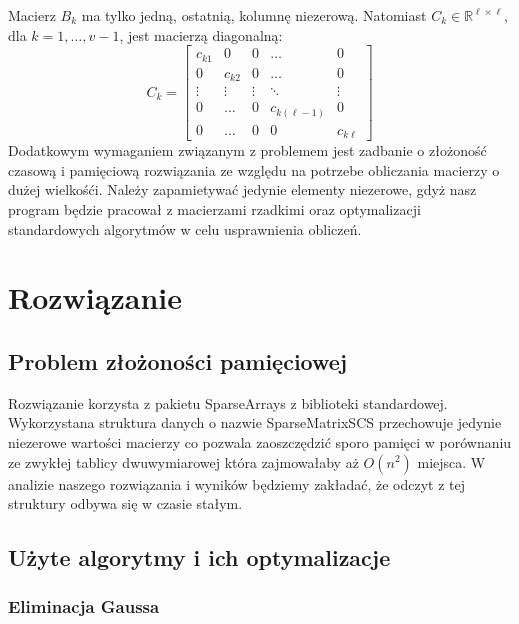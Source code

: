 \documentclass{article}
\begin{document}
	Macierz $B_k$ ma tylko jedną, ostatnią, kolumnę niezerową. Natomiast $C_k \in \mathbb{R}^{\ell \times \ell}$, dla $k = 1, \ldots, v - 1$, jest macierzą diagonalną:\\
	\[
	C_k = \begin{bmatrix}
	    c_{k1} & 0 & 0 & \dots & 0 \\
	    0 & c_{k2} & 0 & \dots & 0 \\
	    \vdots & \vdots & \vdots & \ddots & \vdots \\
	    0 & \dots & 0 & c_{k(\ell-1)} & 0 \\
	    0 & \dots & 0 & 0 & c_{k\ell}
	\end{bmatrix}
	\]
	Dodatkowym wymaganiem związanym z problemem jest zadbanie o złożoność czasową i pamięciową rozwiązania ze względu na potrzebe obliczania macierzy o dużej wielkośći. Należy zapamietywać jedynie elementy niezerowe, gdyż nasz program będzie  pracował z macierzami rzadkimi oraz optymalizacji standardowych algorytmów w celu usprawnienia obliczeń.

\section*{Rozwiązanie}
\subsection*{Problem złożoności pamięciowej}
	Rozwiązanie korzysta z pakietu SparseArrays z biblioteki standardowej. Wykorzystana struktura danych o nazwie SparseMatrixSCS przechowuje jedynie niezerowe wartości macierzy co pozwala zaoszczędzić sporo pamięci w porównaniu ze zwykłej tablicy dwuwymiarowej która zajmowałaby aż $O(n^2)$ miejsca. W analizie naszego rozwiązania i wyników będziemy zakładać, że odczyt z tej struktury odbywa się w czasie stałym.

\subsection*{Użyte algorytmy i ich optymalizacje}
\subsubsection*{Eliminacja Gaussa}
\end{document}
